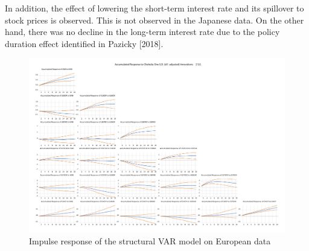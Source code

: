 \documentclass[12pt]{article}
\begin{document}
In addition, the effect of lowering the short-term interest rate and its spillover to stock prices is observed.
This is not observed in the Japanese data.
On the other hand, there was no decline in the long-term interest rate due to the policy duration effect identified in Pazicky [2018].

\newpage
\begin{figure}[!htbp]
    \centering
    \caption{Impulse response of the structural VAR model on European data}
    \vspace{10pt}
    \includegraphics[width=18cm]{eimpulse.pdf}
\end{figure}

\newpage
\end{document}
